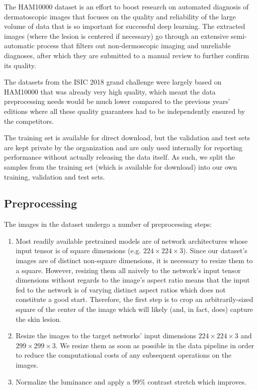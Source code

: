 The HAM10000 \cite{ham10000} dataset is an effort to boost research on automated diagnosis of dermatoscopic images that focuses on the quality and reliability of the large volume of data that is so important for successful deep learning. The extracted images (where the lesion is centered if necessary) go through an extensive semi-automatic process that filters out non-dermoscopic imaging and unreliable diagnoses, after which they are submitted to a manual review to further confirm its quality.

The datasets from the ISIC 2018 grand challenge \cite{isic2018} were largely based on HAM10000 that was already very high quality, which meant the data preprocessing needs would be much lower compared to the previous years' editions where all these quality guarantees had to be independently ensured by the competitors.

The training set is available for direct download, but the validation and test sets are kept private by the organization and are only used internally for reporting performance without actually releasing the data itself. As such, we split the samples from the training set (which is available for download) into our own training, validation and test sets.

\subsection{Preprocessing}
\label{subsection:preprocessing}

The images in the dataset undergo a number of preprocessing steps:

\begin{enumerate}
    \item Most readily available pretrained models are of network architectures whose input tensor is of square dimensions (e.g. $224 \times 224 \times 3$). Since our dataset's images are of distinct non-square dimensions, it is necessary to resize them to a square. However, resizing them all naively to the network's input tensor dimensions without regards to the image's aspect ratio means that the input fed to the network is of varying distinct aspect ratios which does not constitute a good start. Therefore, the first step is to crop an arbitrarily-sized square of the center of the image which will likely (and, in fact, does) capture the skin lesion.
    \item Resize the images to the target networks' input dimensions $224 \times 224 \times 3$ and $299 \times 299 \times 3$. We resize them as soon as possible in the data pipeline in order to reduce the computational costs of any subsequent operations on the images.
    \item Normalize the luminance and apply a 99\% contrast stretch which improves.
\end{enumerate}

